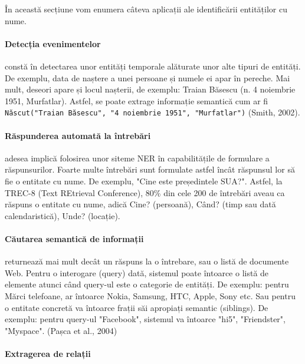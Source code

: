 În această secțiune vom enumera câteva aplicații ale identificării entităților cu nume.

\paragraph{Detecția evenimentelor}

constă în detectarea unor entități temporale alăturate unor alte tipuri de entități. De exemplu, data de naștere a unei persoane și numele ei apar în pereche. Mai mult, deseori apare și locul nașterii, de exemplu: Traian Băsescu (n. 4 noiembrie 1951, Murfatlar). Astfel, se poate extrage informație semantică cum ar fi \texttt{Născut("Traian Băsescu", "4 noiembrie 1951", "Murfatlar")} (Smith, 2002).\cite{Smith02detectingand}

\paragraph{Răspunderea automată la întrebări}

adesea implică folosirea unor siteme NER în capabilitățile de formulare a răspunsurilor. Foarte multe întrebări sunt formulate astfel încât răspunsul lor să fie o entitate cu nume. De exemplu, "Cine este președintele SUA?". Astfel, la TREC-8 (Text REtrieval Conference), 80\% din cele 200 de întrebări aveau ca răspuns o entitate cu nume, adică Cine? (persoană), Când? (timp sau dată calendaristică), Unde? (locație).\cite{trec8}

\paragraph{Căutarea semantică de informații}

returnează mai mult decât un răspuns la o întrebare, sau o listă de documente Web. Pentru o interogare (query) dată, sistemul poate întoarce o listă de elemente atunci când query-ul este o categorie de entități. De exemplu: pentru Mărci telefoane, ar întoarce Nokia, Samsung, HTC, Apple, Sony etc. Sau pentru o entitate concretă va întoarce frații săi apropiați semantic (siblings). De exemplu: pentru query-ul "Facebook", sistemul va întoarce "hi5", "Friendster", "Myspace". (Pașca et al., 2004)\cite{pasca2004}

\paragraph{Extragerea de relații}
\label{paragraph:relation}

